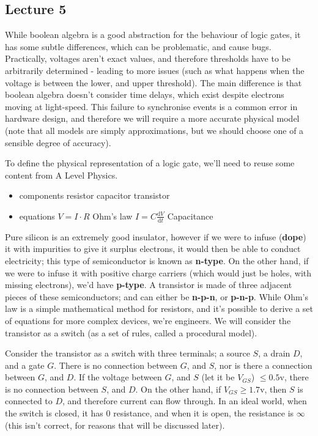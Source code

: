 \documentclass[a4paper, 12pt]{article}
\newcommand{\dif}[2]{\frac{\mathrm{d}#1}{\mathrm{d}#2}}
\begin{document}
        \subsection*{Lecture 5}
            While boolean algebra is a good abstraction for the behaviour of logic gates, it has some subtle differences, which can be problematic, and cause bugs. Practically, voltages aren't exact values, and therefore thresholds have to be arbitrarily determined - leading to more issues (such as what happens when the voltage is between the lower, and upper threshold). The main difference is that boolean algebra doesn't consider time delays, which exist despite electrons moving at light-speed. This failure to synchronise events is a common error in hardware design, and therefore we will require a more accurate physical model (note that all models are simply approximations, but we should choose one of a sensible degree of accuracy).
            \medskip

            To define the physical representation of a logic gate, we'll need to reuse some content from A Level Physics.
            \begin{itemize}
                \itemsep0em
                \item components
                    \subitem resistor
                    \subitem capacitor
                    \subitem transistor
                \item equations
                    \subitem $V = I \cdot R$ \hfill Ohm's law
                    \subitem $I = C\dif{V}{t}$ \hfill Capacitance
            \end{itemize}
            Pure silicon is an extremely good insulator, however if we were to infuse (\textbf{dope}) it with impurities to give it surplus electrons, it would then be able to conduct electricity; this type of semiconductor is known as \textbf{n-type}. On the other hand, if we were to infuse it with positive charge carriers (which would just be holes, with missing electrons), we'd have \textbf{p-type}. A transistor is made of three adjacent pieces of these semiconductors; and can either be \textbf{n-p-n}, or \textbf{p-n-p}. While Ohm's law is a simple mathematical method for resistors, and it's possible to derive a set of equations for more complex devices, we're engineers. We will consider the transistor as a switch (as a set of rules, called a procedural model).
            \medskip

            Consider the transistor as a switch with three terminals; a source $S$, a drain $D$, and a gate $G$. There is no connection between $G$, and $S$, nor is there a connection between $G$, and $D$. If the voltage between $G$, and $S$ (let it be $V_{GS}$) $\leq 0.5\mathrm{v}$, there is no connection between $S$, and $D$. On the other hand, if $V_{GS} \geq 1.7\mathrm{v}$, then $S$ is connected to $D$, and therefore current can flow through. In an ideal world, when the switch is closed, it has 0 resistance, and when it is open, the resistance is $\infty$ (this isn't correct, for reasons that will be discussed later).
            \medskip
\end{document}
